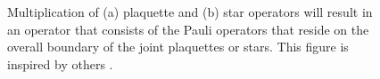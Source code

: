 
\begin{figure}[htbp]
  \centering
  \hspace{1cm}
  \caption{Multiplication of (a) plaquette and (b) star operators will result in an operator that consists of the Pauli operators that reside on the overall boundary of the joint plaquettes or stars. This figure is inspired by others \cite{browne}.}\label{sf:fig_multistab}
\end{figure}